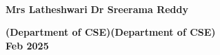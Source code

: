 \documentclass[12pt,a4paper]{report}
\begin{document}
\begin{titlepage}
\begin{center}
\underline{\hspace{4cm}}\hspace{2.1in}\underline{\hspace{5cm}}\\
\vspace{0.1in}

\textbf{Mrs Latheshwari}\hspace{2.3in} \textbf{Dr Sreerama Reddy}\\
\vspace{0.1in}

\textbf{(Department of CSE)}\hspace{2.1in}\textbf{(Department of CSE)}\\
\vspace{0.2in}
\textbf{Feb 2025}

\end{center}
\end{titlepage}
\end{document}
